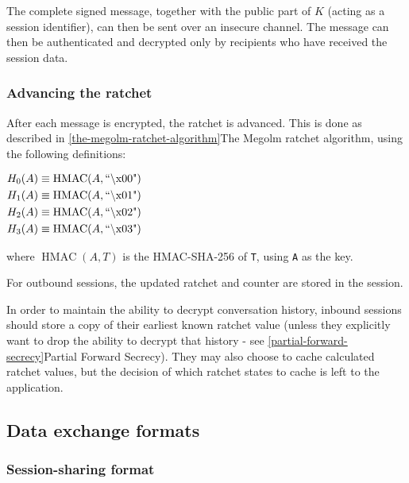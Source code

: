 \documentclass[10pt]{article}
\begin{document}
The complete signed message, together with the public part of \(K\)
(acting as a session identifier), can then be sent over an insecure
channel. The message can then be authenticated and decrypted only by
recipients who have received the session data.

\subsubsection{Advancing the ratchet}\label{advancing-the-ratchet}

After each message is encrypted, the ratchet is advanced. This is done
as described in \ref{the-megolm-ratchet-algorithm}{The
Megolm ratchet algorithm}, using the following definitions:

$\begin{aligned}
    H_0(A) &\equiv \operatorname{HMAC}(A,\text{``\char`\\x00"}) \\
    H_1(A) &\equiv \operatorname{HMAC}(A,\text{``\char`\\x01"}) \\
    H_2(A) &\equiv \operatorname{HMAC}(A,\text{``\char`\\x02"}) \\
    H_3(A) &\equiv \operatorname{HMAC}(A,\text{``\char`\\x03"}) \\
\end{aligned}$

where \(\operatorname{HMAC}(A, T)\) is the HMAC-SHA-256 of \texttt{T},
using \texttt{A} as the key.

For outbound sessions, the updated ratchet and counter are stored in the
session.

In order to maintain the ability to decrypt conversation history,
inbound sessions should store a copy of their earliest known ratchet
value (unless they explicitly want to drop the ability to decrypt that
history - see \ref{partial-forward-secrecy}{Partial
Forward Secrecy}). They may also choose to cache calculated ratchet
values, but the decision of which ratchet states to cache is left to the
application.

\subsection{Data exchange formats}\label{data-exchange-formats}

\subsubsection{Session-sharing format}\label{session-sharing-format}
\end{document}
